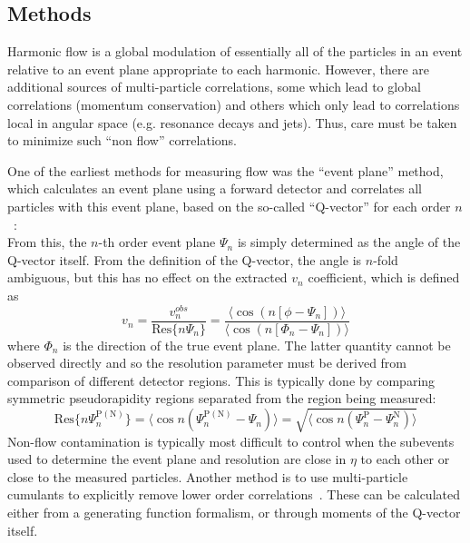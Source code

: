 \subsection{Methods}
\label{subsect:pas:flow:methods}
Harmonic flow is a global modulation of essentially all of the particles in an event relative to an event plane
appropriate to each harmonic.  However, there are additional sources of multi-particle correlations, some which
lead to global correlations (momentum conservation) and others which only lead to correlations local in angular space
(e.g. resonance decays and jets).  Thus, care must be taken to minimize such ``non flow'' correlations.

One of the earliest methods for measuring flow was the ``event plane'' method, which calculates an event plane using
a forward detector and correlates all particles with this event plane, based on the so-called ``Q-vector'' for each order $n$~\cite{Poskanzer:1998yz}:
\begin{equation}
\end{equation}
From this, the $n$-th order event plane $\Psi_n$ is simply determined as the angle of the Q-vector itself.
From the definition of the Q-vector, the angle is $n$-fold ambiguous, but this has no effect on the extracted
$v_n$ coefficient, which is defined as
\begin{equation}
v_n = \frac{v^{obs}_n}{\mathrm{Res}\{ n \Psi_n \}} = \frac{ \langle \cos ( n [\phi - \Psi_n] ) \rangle }{ \langle \cos ( n [\Phi_n - \Psi_n] ) \rangle    }
\end{equation}
where $\Phi_n$ is the direction of the true event plane.  The latter quantity cannot be observed directly and so the
resolution parameter must be derived from comparison of different detector regions.  This is typically done by comparing
symmetric pseudorapidity regions separated from the region being measured:
\begin{equation}
\mathrm{Res} \{ n \Psi_n^{\mathrm{P(N)}} \} =
\langle \cos n ( \Psi_n^{\mathrm{P(N)}} - \Psi_n ) \rangle =
\sqrt{ \langle \cos n ( \Psi_n^{\mathrm{P}} - \Psi_n^{\mathrm{N}} ) \rangle }
\end{equation}
Non-flow contamination is typically most difficult to control when the subevents used to determine the event plane
and resolution are close in $\eta$ to each other or close to the measured particles.
%
Another method is to use multi-particle cumulants to explicitly remove lower order 
correlations~\cite{Borghini:2000sa,Borghini:2001vi,Borghini:2001zr,Bilandzic:2010jr}.
These can be calculated either from a generating function formalism, or through moments of the Q-vector itself.
